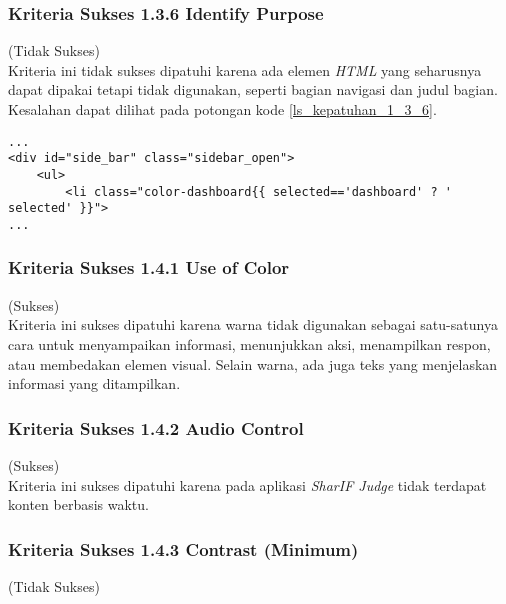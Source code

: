 \subsubsection{Kriteria Sukses 1.3.6 Identify Purpose}
\label{subsubsec:kepatuhan_kriteria_1.3.6}
(Tidak Sukses) \\

Kriteria ini tidak sukses dipatuhi karena ada elemen \textit{HTML} yang seharusnya dapat dipakai tetapi tidak digunakan, seperti bagian navigasi dan judul bagian. Kesalahan dapat dilihat pada potongan kode \ref{ls_kepatuhan_1_3_6}.
\begin{lstlisting}[basicstyle=\ttfamily, frame=single,
columns=fullflexible, keepspaces=true, breaklines=true, label=ls_kepatuhan_1_3_6, caption=Kriteria Sukses 1.3.6 - \textit{Sidebar}]
...
<div id="side_bar" class="sidebar_open">
	<ul>
		<li class="color-dashboard{{ selected=='dashboard' ? ' selected' }}">
...
\end{lstlisting}

\subsubsection{Kriteria Sukses 1.4.1 Use of Color}
\label{subsubsec:kepatuhan_kriteria_1.4.1}
(Sukses) \\

Kriteria ini sukses dipatuhi karena warna tidak digunakan sebagai satu-satunya cara untuk menyampaikan informasi, menunjukkan aksi, menampilkan respon, atau membedakan elemen visual. Selain warna, ada juga teks yang menjelaskan informasi yang ditampilkan.

\subsubsection{Kriteria Sukses 1.4.2 Audio Control}
\label{subsubsec:kepatuhan_kriteria_1.4.2}
(Sukses) \\

Kriteria ini sukses dipatuhi karena pada aplikasi \textit{SharIF Judge} tidak terdapat konten berbasis waktu.

\subsubsection{Kriteria Sukses 1.4.3 Contrast (Minimum)}
\label{subsubsec:kepatuhan_kriteria_1.4.3}
(Tidak Sukses) \\

